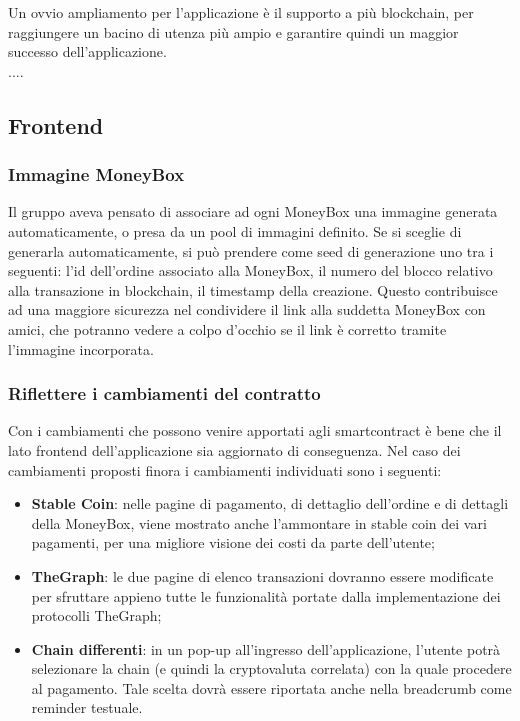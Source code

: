 Un ovvio ampliamento per l'applicazione è il supporto a più blockchain, per raggiungere un bacino di utenza più ampio e garantire quindi un maggior successo dell'applicazione.\\
....

\subsection{Frontend}

\subsubsection{Immagine MoneyBox}

Il gruppo aveva pensato di associare ad ogni MoneyBox una immagine generata automaticamente, o presa da un pool di immagini definito. Se si sceglie di generarla automaticamente, si può prendere come seed di generazione uno tra i seguenti: l'id dell'ordine associato alla MoneyBox, 
il numero del blocco relativo alla transazione in blockchain, il timestamp della creazione.
Questo contribuisce ad una maggiore sicurezza nel condividere il link alla suddetta MoneyBox con amici, che potranno vedere a colpo d'occhio se il link è corretto tramite l'immagine incorporata.

\subsubsection{Riflettere i cambiamenti del contratto}

Con i cambiamenti che possono venire apportati agli smartcontract è bene che il lato frontend dell'applicazione sia aggiornato di conseguenza.
Nel caso dei cambiamenti proposti finora i cambiamenti individuati sono i seguenti:
\begin{itemize}
    \item \textbf{Stable Coin}: nelle pagine di pagamento, di dettaglio dell'ordine e di dettagli della MoneyBox, viene mostrato anche l'ammontare in stable coin dei vari pagamenti, per una migliore visione dei costi da parte dell'utente;
    \item \textbf{TheGraph}: le due pagine di elenco transazioni dovranno essere modificate per sfruttare appieno tutte le funzionalità portate dalla implementazione dei protocolli TheGraph;
    \item \textbf{Chain differenti}:  in un pop-up all'ingresso dell'applicazione, l'utente potrà selezionare la chain (e quindi la cryptovaluta correlata) con la quale procedere al pagamento. Tale scelta dovrà essere riportata anche nella breadcrumb come reminder testuale.
\end{itemize}

